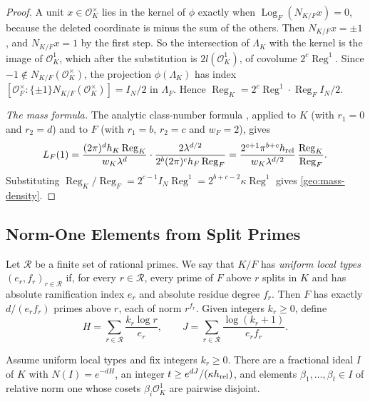 \begin{proof}
A unit $x\in\mathcal O_K^\times$ lies in the kernel of $\phi$ exactly
when $\operatorname{Log}_F(N_{K/F}x)=0$, because the deleted coordinate
is minus the sum of the others. Then $N_{K/F}x=\pm1$, and $N_{K/F}x=1$
by the first step. So the intersection of $\Lambda_K$ with the kernel is
the image of $\mathcal O_K^1$, which after the substitution is
$2l(\mathcal O_K^1)$, of covolume $2^c\operatorname{Reg}^1$. Since
$-1\notin N_{K/F}(\mathcal O_K^\times)$, the projection
$\phi(\Lambda_K)$ has index
$[\mathcal O_F^\times:\{\pm1\}N_{K/F}(\mathcal O_K^\times)]=I_N/2$ in
$\Lambda_F$. Hence
$\operatorname{Reg}_K=2^c\operatorname{Reg}^1\cdot\operatorname{Reg}_FI_N/2$.

\emph{The mass formula.} The analytic class-number formula
\cite[Chapter~V, Theorem~2.4]{MilneCFT}, applied to $K$ (with $r_1=0$
and $r_2=d$) and to $F$ (with $r_1=b$, $r_2=c$ and $w_F=2$), gives
\[
 L_F(1)=\frac{(2\pi)^dh_K\operatorname{Reg}_K}{w_K\lambda^d}\cdot
 \frac{2\lambda^{d/2}}{2^b(2\pi)^ch_F\operatorname{Reg}_F}
 =\frac{2^{c+1}\pi^{b+c}h_{\rm rel}}{w_K\lambda^{d/2}}\,
 \frac{\operatorname{Reg}_K}{\operatorname{Reg}_F}.
\]
Substituting
$\operatorname{Reg}_K/\operatorname{Reg}_F=2^{c-1}I_N\operatorname{Reg}^1
=2^{b+c-2}\kappa\operatorname{Reg}^1$ gives \eqref{geo:mass-density}.
\end{proof}

\subsection{Norm-One Elements from Split Primes}
Let $\mathcal R$ be a finite set of rational primes. We say that $K/F$
has \emph{uniform local types} $(e_r,f_r)_{r\in\mathcal R}$ if, for
every $r\in\mathcal R$, every prime of $F$ above $r$ splits in $K$ and
has absolute ramification index $e_r$ and absolute residue degree $f_r$.
Then $F$ has exactly $d/(e_rf_r)$ primes above $r$, each of norm
$r^{f_r}$. Given integers $k_r\ge0$, define
\begin{equation}\label{geo:HJ}
 H=\sum_{r\in\mathcal R}\frac{k_r\log r}{e_r},\qquad
 J=\sum_{r\in\mathcal R}\frac{\log(k_r+1)}{e_rf_r}.
\end{equation}

\begin{lemma}\label{geo:selection}
Assume uniform local types and fix integers $k_r\ge0$. There are a
fractional ideal $I$ of $K$ with $N(I)=e^{-dH}$, an integer
$t\ge e^{dJ}/(\kappa h_{\rm rel})$, and elements
$\beta_1,\dots,\beta_t\in I$ of relative norm one whose cosets
$\beta_i\mathcal O_K^1$ are pairwise disjoint.
\end{lemma}

